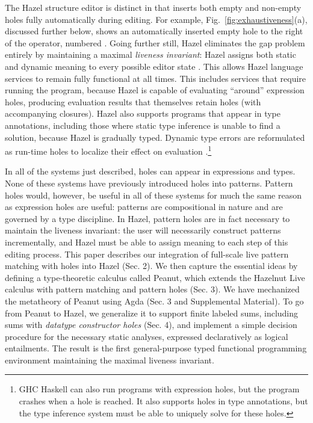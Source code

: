The Hazel structure editor is distinct in that inserts both empty and non-empty holes fully automatically during editing.
For example, Fig.~\ref{fig:exhaustiveness}(a), discussed further below, shows an automatically inserted empty hole to the right of the \li{::} operator, numbered . Going further still, Hazel eliminates the gap problem entirely by maintaining a maximal \emph{liveness invariant}: Hazel assigns both static and dynamic meaning to every possible editor state \cite{DBLP:conf/popl/OmarVHAH17, DBLP:journals/pacmpl/OmarVCH19}. This allows Hazel language services to remain fully functional at all
times. This includes services that require running the program, because Hazel is capable of evaluating ``around'' 
expression holes, producing evaluation results that themselves retain holes (with accompanying closures). Hazel also supports programs that appear in type annotations, including those where static type inference is unable to find a solution, because Hazel is gradually typed. Dynamic type errors are reformulated as run-time holes to localize their effect on evaluation \cite{DBLP:journals/pacmpl/OmarVCH19}.\footnote{GHC Haskell can also run programs with expression holes, but the program crashes when a hole is reached. It also supports holes in type annotations, but the type inference system must be able to uniquely solve for these holes.} 

In all of the systems just described, 
holes can appear in expressions and types.
None of these systems have previously introduced holes into patterns. 
Pattern holes would, however, be useful in all of these systems for much the same reason as expression holes are useful: patterns are compositional in nature and are governed by a type discipline. 
In Hazel, pattern holes are in fact necessary to maintain the liveness invariant: the user will necessarily construct patterns incrementally, and Hazel must be able to assign meaning to each step of this editing process.
This paper describes our integration of full-scale live pattern matching with holes into Hazel (Sec. 2). We then capture the essential ideas by defining a type-theoretic calculus called Peanut, which extends the Hazelnut Live calculus with pattern matching and pattern holes (Sec. 3). We have mechanized the metatheory of Peanut using Agda (Sec. 3 and Supplemental Material). To go from Peanut to Hazel, we generalize it to support finite labeled sums, including sums with \emph{datatype constructor holes} (Sec. 4), and implement a simple decision procedure for the necessary static analyses, expressed declaratively as logical entailments. The result is the first general-purpose typed functional programming environment maintaining the maximal liveness invariant.

